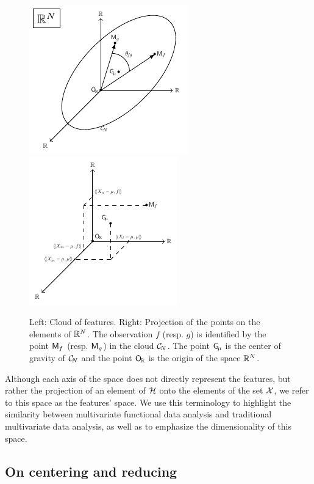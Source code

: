 \begin{figure}
    \centering
    \includegraphics[scale=1.2]{figures/cloud_features.pdf}
    \includegraphics[scale=1.2]{figures/cloud_features_proj.pdf}
    \caption{Left: Cloud of features. Right: Projection of the points on the elements of $\mathbb{R}^N$. The observation $f$ (resp. $g$) is identified by the point $\mathsf{M}_f$ (resp. $\mathsf{M}_g$) in the cloud $\mathcal{C}_{\!N}$. The point $\mathsf{G}_{\!\mu}$ is the center of gravity of $\mathcal{C}_{\!N}$ and the point $\mathsf{O}_{\!\mathbb{R}}$ is the origin of the space $\mathbb{R}^N$.}
    \label{fig:cloud_features}
\end{figure}

\begin{remark}
   Although each axis of the space does not directly represent the features, but rather the projection of an element of $\mathcal{H}$ onto the elements of the set $\mathcal{X}$, we refer to this space as the features' space. We use this terminology to highlight the similarity between multivariate functional data analysis and traditional multivariate data analysis, as well as to emphasize the dimensionality of this space.
\end{remark}

\subsection{On centering and reducing} %
\label{sub:on_centering_and_reducing}

